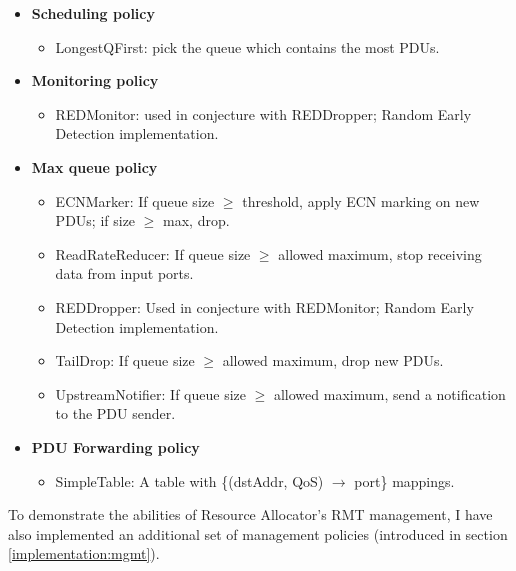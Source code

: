         \begin{itemize}
            \item \textbf{Scheduling policy}
            \begin{itemize}
                \item LongestQFirst: pick the queue which contains the most PDUs.
            \end{itemize}
            \item \textbf{Monitoring policy}
            \begin{itemize}
                \item REDMonitor: used in conjecture with REDDropper; Random Early Detection implementation.
            \end{itemize}
            \item \textbf{Max queue policy}
            \begin{itemize}
                \item ECNMarker: If queue size $\geq$ threshold, apply ECN marking on new PDUs; if size $\geq$ max, drop.
                \item ReadRateReducer: If queue size $\geq$ allowed maximum, stop receiving data from input ports.
                \item REDDropper: Used in conjecture with REDMonitor; Random Early Detection implementation.
                \item TailDrop: If queue size $\geq$ allowed maximum, drop new PDUs.
                \item UpstreamNotifier: If queue size $\geq$ allowed maximum, send a notification to the PDU sender.
            \end{itemize}
            \item \textbf{PDU Forwarding policy}
            \begin{itemize}
                \item SimpleTable: A table with \{(dstAddr, QoS) $\rightarrow$ port\} mappings.
            \end{itemize}
        \end{itemize}

        To demonstrate the abilities of Resource Allocator's RMT management, I have also implemented an additional set of management policies (introduced in section \ref{implementation:mgmt}).

